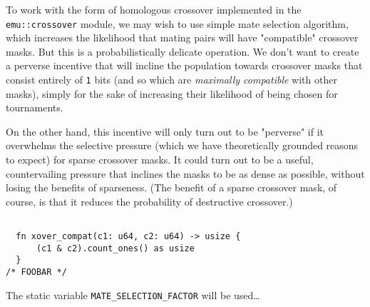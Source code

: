 \documentclass[11pt]{article}
\begin{document}
To work with the form of homologous crossover implemented in the
\texttt{emu::crossover} module, we may wish to use simple mate selection
algorithm, which increases the likelihood that mating pairs will
have "compatible" crossover masks. But this is a probabilistically
delicate operation. We don't want to create a perverse incentive
that will incline the population towards crossover masks that consist
entirely of \texttt{1} bits (and so which are \emph{maximally compatible} with other
masks), simply for the sake of increasing their likelihood of being
chosen for tournaments. 

On the other hand, this incentive will only turn out to be "perverse"
if it overwhelms the selective pressure (which we have theoretically
grounded reasons to expect) for sparse crossover masks. It could turn
out to be a useful, countervailing pressure that inclines the masks
to be as dense as possible, without losing the benefits of sparseness.
(The benefit of a sparse crossover mask, of course, is that it reduces
the probability of destructive crossover.)

\lstset{language=rust,label=org47aa36a,caption= ,captionpos=b,numbers=none}
\begin{lstlisting}

  fn xover_compat(c1: u64, c2: u64) -> usize {
      (c1 & c2).count_ones() as usize
  }
/* FOOBAR */
\end{lstlisting}

The static variable \texttt{MATE\_SELECTION\_FACTOR} will be used\ldots{}
\end{document}
